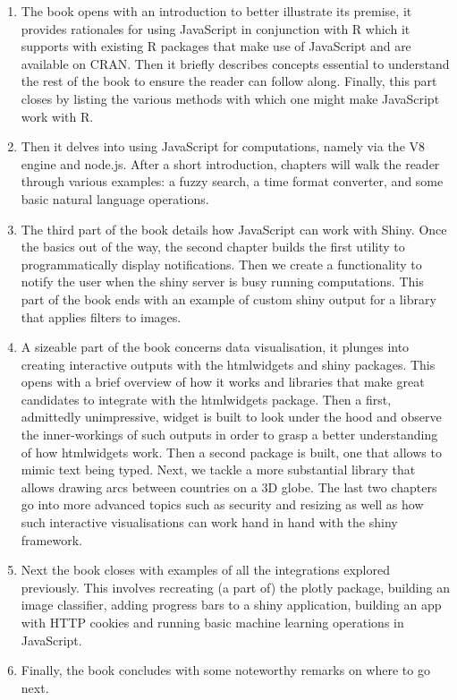 \documentclass[
]{krantz}
\begin{document}
\begin{enumerate}
\def\labelenumi{\arabic{enumi}.}
\item
  The book opens with an introduction to better illustrate its premise, it provides rationales for using JavaScript in conjunction with R which it supports with existing R packages that make use of JavaScript and are available on CRAN. Then it briefly describes concepts essential to understand the rest of the book to ensure the reader can follow along. Finally, this part closes by listing the various methods with which one might make JavaScript work with R.
\item
  Then it delves into using JavaScript for computations, namely via the V8 engine and node.js. After a short introduction, chapters will walk the reader through various examples: a fuzzy search, a time format converter, and some basic natural language operations.
\item
  The third part of the book details how JavaScript can work with Shiny. Once the basics out of the way, the second chapter builds the first utility to programmatically display notifications. Then we create a functionality to notify the user when the shiny server is busy running computations. This part of the book ends with an example of custom shiny output for a library that applies filters to images.
\item
  A sizeable part of the book concerns data visualisation, it plunges into creating interactive outputs with the htmlwidgets and shiny packages. This opens with a brief overview of how it works and libraries that make great candidates to integrate with the htmlwidgets package. Then a first, admittedly unimpressive, widget is built to look under the hood and observe the inner-workings of such outputs in order to grasp a better understanding of how htmlwidgets work. Then a second package is built, one that allows to mimic text being typed. Next, we tackle a more substantial library that allows drawing arcs between countries on a 3D globe. The last two chapters go into more advanced topics such as security and resizing as well as how such interactive visualisations can work hand in hand with the shiny framework.
\item
  Next the book closes with examples of all the integrations explored previously. This involves recreating (a part of) the plotly package, building an image classifier, adding progress bars to a shiny application, building an app with HTTP cookies and running basic machine learning operations in JavaScript.
\item
  Finally, the book concludes with some noteworthy remarks on where to go next.
\end{enumerate}
\end{document}
